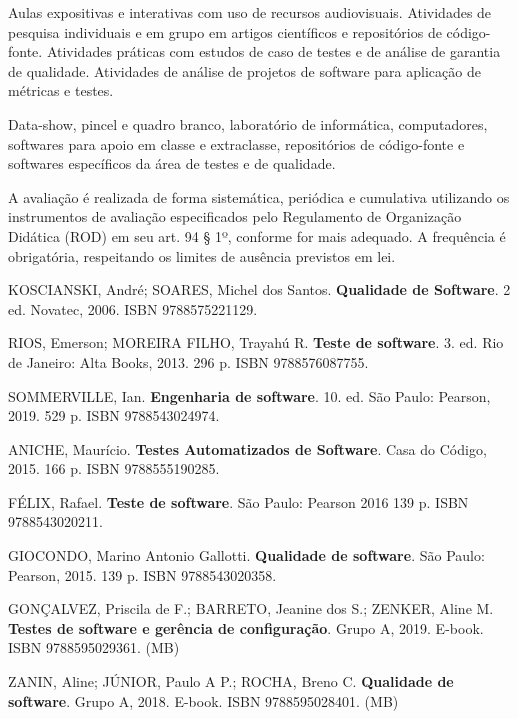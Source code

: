 \begin{pud}
	\metodologia
	Aulas expositivas e interativas com uso de recursos audiovisuais. Atividades de
pesquisa individuais e em grupo em artigos científicos e repositórios de código-
fonte. Atividades práticas com estudos de caso de testes e de análise de garantia
de qualidade. Atividades de análise de projetos de software para aplicação de
métricas e testes.

	\recursos
	Data-show, pincel e quadro branco, laboratório de informática, computadores,
softwares para apoio em classe e extraclasse, repositórios de código-fonte e
softwares específicos da área de testes e de qualidade.

	\avaliacao
	A avaliação é realizada de forma sistemática, periódica e cumulativa utilizando os
instrumentos de avaliação especificados pelo Regulamento de Organização
Didática (ROD) em seu art. 94 § 1º, conforme for mais adequado. A frequência é
obrigatória, respeitando os limites de ausência previstos em lei.
	\naopresencial
	
	\begin{bibbasica}
		\item KOSCIANSKI, André; SOARES, Michel dos Santos. \textbf{Qualidade de Software}. 2
ed. Novatec, 2006. ISBN 9788575221129.
		\item RIOS, Emerson; MOREIRA FILHO, Trayahú R. \textbf{Teste de software}. 3. ed. Rio de
Janeiro: Alta Books, 2013. 296 p. ISBN 9788576087755.
		\item SOMMERVILLE, Ian. \textbf{Engenharia de software}. 10. ed. São Paulo: Pearson, 2019.
529 p. ISBN 9788543024974.
	\end{bibbasica}
	
	
	\begin{bibcomplementar}
		\item ANICHE, Maurício. \textbf{Testes Automatizados de Software}. Casa do Código, 2015.
166 p. ISBN 9788555190285.
		\item FÉLIX, Rafael. \textbf{Teste de software}. São Paulo: Pearson 2016 139 p. ISBN
9788543020211.
		\item GIOCONDO, Marino Antonio Gallotti. \textbf{Qualidade de software}. São Paulo:
Pearson, 2015. 139 p. ISBN 9788543020358.
		\item GONÇALVEZ, Priscila de F.; BARRETO, Jeanine dos S.; ZENKER, Aline M.
\textbf{Testes de software e gerência de configuração}. Grupo A, 2019. E-book. ISBN
9788595029361. (MB)
		\item ZANIN, Aline; JÚNIOR, Paulo A P.; ROCHA, Breno C. \textbf{Qualidade de software}.
Grupo A, 2018. E-book. ISBN 9788595028401. (MB)
	\end{bibcomplementar}

\end{pud}

